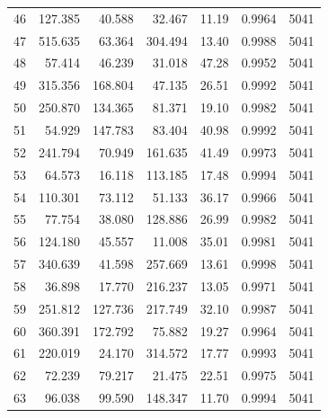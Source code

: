 \begin{longtable}{rrrrrrr}
46 & 127.385 & 40.588 & 32.467 & 11.19 & 0.9964 & 5041 \\
47 & 515.635 & 63.364 & 304.494 & 13.40 & 0.9988 & 5041 \\
48 & 57.414 & 46.239 & 31.018 & 47.28 & 0.9952 & 5041 \\
49 & 315.356 & 168.804 & 47.135 & 26.51 & 0.9992 & 5041 \\
50 & 250.870 & 134.365 & 81.371 & 19.10 & 0.9982 & 5041 \\
51 & 54.929 & 147.783 & 83.404 & 40.98 & 0.9992 & 5041 \\
52 & 241.794 & 70.949 & 161.635 & 41.49 & 0.9973 & 5041 \\
53 & 64.573 & 16.118 & 113.185 & 17.48 & 0.9994 & 5041 \\
54 & 110.301 & 73.112 & 51.133 & 36.17 & 0.9966 & 5041 \\
55 & 77.754 & 38.080 & 128.886 & 26.99 & 0.9982 & 5041 \\
56 & 124.180 & 45.557 & 11.008 & 35.01 & 0.9981 & 5041 \\
57 & 340.639 & 41.598 & 257.669 & 13.61 & 0.9998 & 5041 \\
58 & 36.898 & 17.770 & 216.237 & 13.05 & 0.9971 & 5041 \\
59 & 251.812 & 127.736 & 217.749 & 32.10 & 0.9987 & 5041 \\
60 & 360.391 & 172.792 & 75.882 & 19.27 & 0.9964 & 5041 \\
61 & 220.019 & 24.170 & 314.572 & 17.77 & 0.9993 & 5041 \\
62 & 72.239 & 79.217 & 21.475 & 22.51 & 0.9975 & 5041 \\
63 & 96.038 & 99.590 & 148.347 & 11.70 & 0.9994 & 5041 \\
\bottomrule
\end{longtable}

